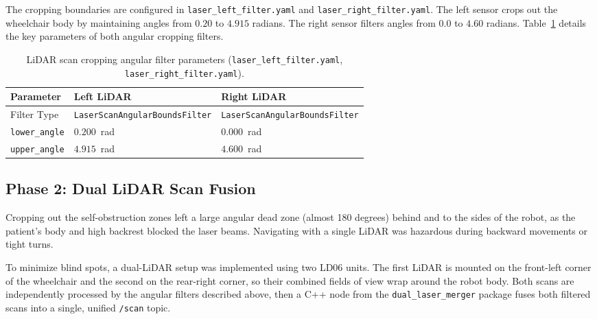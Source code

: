 The cropping boundaries are configured in \texttt{laser\_left\_filter.yaml} and \texttt{laser\_right\_filter.yaml}. The left sensor crops out the wheelchair body by maintaining angles from $0.20$ to $4.915$ radians. The right sensor filters angles from $0.0$ to $4.60$ radians. Table~\ref{tab:laser_filters} details the key parameters of both angular cropping filters.

\begin{table}[H]
\centering
\caption{LiDAR scan cropping angular filter parameters (\texttt{laser\_left\_filter.yaml}, \texttt{laser\_right\_filter.yaml}).}
\label{tab:laser_filters}
\renewcommand{\arraystretch}{1.2}
\begin{tabular}{lll}
\toprule
\textbf{Parameter} & \textbf{Left LiDAR} & \textbf{Right LiDAR} \\
\midrule
Filter Type & \texttt{LaserScanAngularBoundsFilter} & \texttt{LaserScanAngularBoundsFilter} \\
\texttt{lower\_angle} & $0.200$~rad & $0.000$~rad \\
\texttt{upper\_angle} & $4.915$~rad & $4.600$~rad \\
\bottomrule
\end{tabular}
\end{table}

\subsection{Phase 2: Dual LiDAR Scan Fusion}

Cropping out the self-obstruction zones left a large angular dead zone (almost 180 degrees) behind and to the sides of the robot, as the patient's body and high backrest blocked the laser beams. Navigating with a single LiDAR was hazardous during backward movements or tight turns.

To minimize blind spots, a dual-LiDAR setup was implemented using two LD06 units. The first LiDAR is mounted on the front-left corner of the wheelchair and the second on the rear-right corner, so their combined fields of view wrap around the robot body. Both scans are independently processed by the angular filters described above, then a C++ node from the \texttt{dual\_laser\_merger} package fuses both filtered scans into a single, unified \texttt{/scan} topic.

